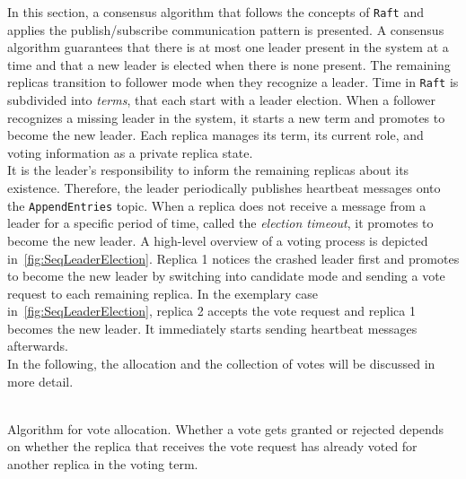 In this section, a consensus algorithm that follows the concepts of \texttt{Raft} and applies the  publish/subscribe communication pattern is presented.
A consensus algorithm guarantees that there is at most one leader present in the system at a time and that a new leader is elected when there is none present.
The remaining replicas transition to follower mode when they recognize a leader.
Time in \texttt{Raft} is subdivided into \textit{terms}, that each start with a leader election.
When a follower recognizes a missing leader in the system, it starts a new term and promotes to become the new leader. 
Each replica manages its term, its current role, and voting information as a private replica state.
\\

It is the leader's responsibility to inform the remaining replicas about its existence.
Therefore, the leader periodically publishes heartbeat messages onto the \texttt{AppendEntries} topic.
When a replica does not receive a message from a leader for a specific period of time, called the \textit{election timeout}, it promotes to become the new leader.
A high-level overview of a voting process is depicted in~\autoref{fig:SeqLeaderElection}.
Replica 1 notices the crashed leader first and promotes to become the new leader by switching into candidate mode and sending a vote request to each remaining replica.
In the exemplary case in~\autoref{fig:SeqLeaderElection}, replica 2 accepts the vote request and replica 1 becomes the new leader.
It immediately starts sending heartbeat messages afterwards.
\\
In the following, the allocation and the collection of votes will be discussed in more detail.
\\\\

\begin{algorithm}[H]
\caption{Algorithm for vote allocation. Whether a vote gets granted or rejected depends on whether the replica that receives the vote request has already voted for another replica in the voting term.}\label{algo:VoteAllocation}

\BlankLine
{}
\end{algorithm}

